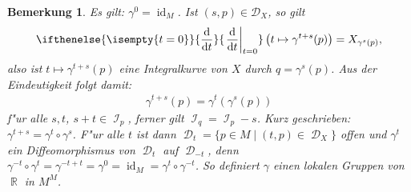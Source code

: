 \documentclass[paper=A4, twoside, chapterprefix=true, bibliography=totoc, headsepline]{scrbook}
\DeclareMathOperator{\R}{\mathbb{R}}
\DeclareMathOperator{\calD}{\mathcal{D}}
\DeclareMathOperator{\calI}{\mathcal{I}}
\DeclareMathOperator{\id}{id} %
\DeclareMathOperator{\Id}{id} %
\newcommand{\dop}{\mathrm{d}}
\newcommand{\difffrac}[3][]{\ifthenelse{\isempty{#1}}{\frac{\dop #2}{\dop #3}}{\left. \frac{\dop #2}{\dop #3} \right|_{#1}}}
\theoremstyle{plain}
\theoremstyle{nonumberplain}
\newtheorem{bem}{Bemerkung}
\theoremstyle{empty}
\theoremstyle{break}
\newcommand{\quot}[1]{\textrm{\glqq}{#1}\textrm{\grqq}}
\begin{document}
\begin{bem}
Es gilt: $\gamma^0 = \Id_M$. Ist $(s,p) \in \mathcal D_{X}$, so gilt
\begin{align*}
	\difffrac[t=0]{}{t} \left(t \mapsto \gamma^{t+s}(p) \right) = X_{\gamma^s(p)},
\end{align*}
also ist $t \mapsto \gamma^{t+s}(p)$ eine Integralkurve von $X$ durch $q = \gamma^s(p)$. Aus der Eindeutigkeit folgt damit:
\begin{align*}
	\gamma^{t+s}(p) = \gamma^t(\gamma^s(p))
\end{align*}
f"ur alle $s, t$, $s+t \in \calI_p$, ferner gilt $\calI_q = \calI_p - s$.
Kurz geschrieben: $\gamma^{t+s} = \gamma^t \circ \gamma^s$.
F"ur alle $t$ ist dann $\calD_t = \{ p \in M \mid (t,p) \in \calD_X \}$ offen und $\gamma^t$ ein Diffeomorphismus von $\calD_t$ auf $\calD_{-t}$, denn $\gamma^{-t} \circ \gamma^{t} = \gamma^{-t+t} = \gamma^{0} = \id_M = \gamma^{t} \circ \gamma^{-t}$.
So definiert $\gamma$ einen \quot{lokalen Gruppen} von $\R$ in $M^M$.
\end{bem}


\end{document}
